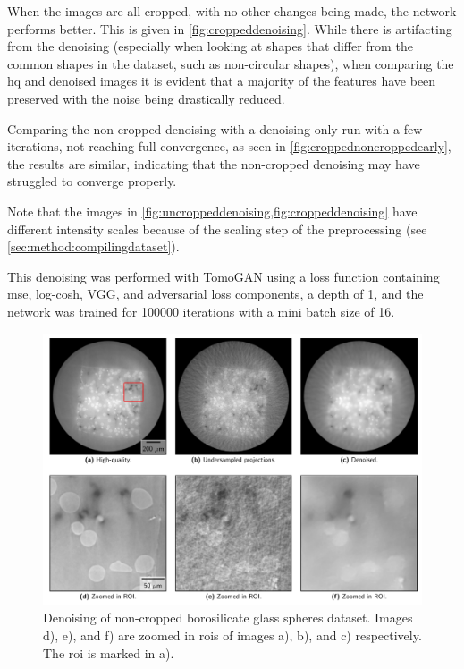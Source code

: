 When the images are all cropped, with no other changes being made, the network performs better. This is given in \cref{fig:croppeddenoising}. While there is artifacting from the denoising (especially when looking at shapes that differ from the common shapes in the dataset, such as non-circular shapes), when comparing the \gls{hq} and denoised images it is evident that a majority of the features have been preserved with the noise being drastically reduced. 

Comparing the non-cropped denoising with a denoising only run with a few iterations, not reaching full convergence, as seen in \cref{fig:croppednoncroppedearly}, the results are similar, indicating that the non-cropped denoising may have struggled to converge properly. 

Note that the images in \cref{fig:uncroppeddenoising,fig:croppeddenoising} have different intensity scales because of the scaling step of the preprocessing (see \cref{sec:method:compilingdataset}). 

This denoising was performed with TomoGAN using a loss function containing \gls{mse}, log-cosh, VGG, and adversarial loss components, a depth of 1, and the network was trained for 100000 iterations with a mini batch size of 16. 

\begin{figure}[htbp]
  \centering
  \includegraphics[width=.9\textwidth]{figures/uncroppeddenoising.pdf}
  \caption[Non-cropped image denoising]{Denoising of non-cropped borosilicate glass spheres dataset. Images d), e), and f) are zoomed in \gls{roi}s of images a), b), and c) respectively. The \gls{roi} is marked in a). }
  \label{fig:uncroppeddenoising}
\end{figure}

